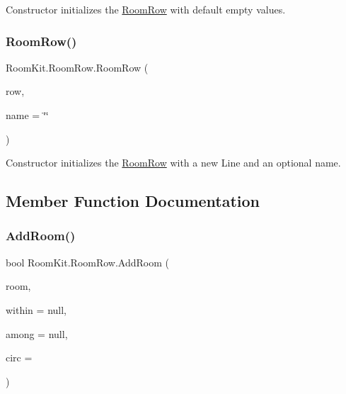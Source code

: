Constructor initializes the \mbox{\hyperlink{class_room_kit_1_1_room_row}{Room\+Row}} with default empty values. 

\mbox{\label{class_room_kit_1_1_room_row_a5f3de939efebb1560150ecf9be9f697c}} 
\subsubsection{\texorpdfstring{Room\+Row()}{RoomRow()}\hspace{0.1cm}{\footnotesize\ttfamily [2/2]}}
{\footnotesize\ttfamily Room\+Kit.\+Room\+Row.\+Room\+Row (\begin{DoxyParamCaption}\item[{Line}]{row,  }\item[{string}]{name = {\ttfamily \char`\"{}\char`\"{}} }\end{DoxyParamCaption})}



Constructor initializes the \mbox{\hyperlink{class_room_kit_1_1_room_row}{Room\+Row}} with a new Line and an optional name. 



\subsection{Member Function Documentation}
\mbox{\label{class_room_kit_1_1_room_row_a461c7592711caf1d35a96693d77fd4df}} 
\subsubsection{\texorpdfstring{Add\+Room()}{AddRoom()}}
{\footnotesize\ttfamily bool Room\+Kit.\+Room\+Row.\+Add\+Room (\begin{DoxyParamCaption}\item[{\mbox{\hyperlink{class_room_kit_1_1_room}{Room}}}]{room,  }\item[{Polygon}]{within = {\ttfamily null},  }\item[{I\+List$<$ Polygon $>$}]{among = {\ttfamily null},  }\item[{double}]{circ = {} }\end{DoxyParamCaption})}





